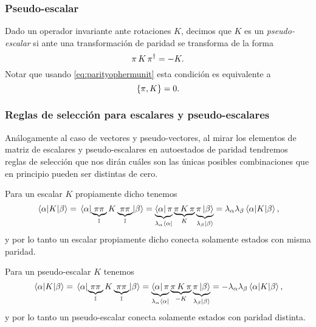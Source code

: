 \documentclass[10pt, a4paper]{article}
\numberwithin{equation}{subsection}
\begin{document}
\subsubsection{Pseudo-escalar}
Dado un operador invariante ante rotaciones $K$, decimos que $K$ es un
\emph{pseudo-escalar} si ante una transformación de paridad se transforma de la
forma
\begin{equation} \label{eq:defpseudoscalar}
  \pi\,K\,\pi^\dagger = -K.
\end{equation}
Notar que usando \eqref{eq:parityophermunit} esta condición es equivalente a
\begin{equation} \label{eq:defpseudoscalaracomm}
  \acomm{\parityop}{K} = 0.
\end{equation}

\subsubsection{Reglas de selección para escalares y pseudo-escalares}

Análogamente al caso de vectores y pseudo-vectores, al mirar los elementos de
matriz de escalares y pseudo-escalares en autoestados de paridad tendremos
reglas de selección que nos dirán cuáles son las únicas posibles combinaciones
que en principio pueden ser distintas de cero.

Para un escalar $K$ propiamente dicho tenemos
\begin{equation}
  \matrixel{\alpha}{K}{\beta} = \matrixel{\alpha}{
    \underbrace{\parityop\parityop}_{\Id} K
    \underbrace{\parityop\parityop}_{\Id}}{\beta}
  = \underbrace{\bra{\alpha}\parityop}_{\lambda_\alpha\bra{\alpha}}
    \underbrace{\parityop\,K\,\parityop}_{K}
    \underbrace{\parityop\ket{\beta}}_{\lambda_\beta\ket{\beta}}
  = \lambda_\alpha\lambda_\beta\matrixel{\alpha}{K}{\beta},
\end{equation}
y por lo tanto un escalar propiamente dicho conecta solamente estados con
misma paridad.

Para un pseudo-escalar $K$ tenemos
\begin{equation}
  \matrixel{\alpha}{K}{\beta} = \matrixel{\alpha}{
    \underbrace{\parityop\parityop}_{\Id} K
    \underbrace{\parityop\parityop}_{\Id}}{\beta}
  = \underbrace{\bra{\alpha}\parityop}_{\lambda_\alpha\bra{\alpha}}
    \underbrace{\parityop\,K\,\parityop}_{-K}
    \underbrace{\parityop\ket{\beta}}_{\lambda_\beta\ket{\beta}}
  = -\lambda_\alpha\lambda_\beta\matrixel{\alpha}{K}{\beta},
\end{equation}
y por lo tanto un pseudo-escalar conecta solamente estados con paridad
distinta.
\end{document}

